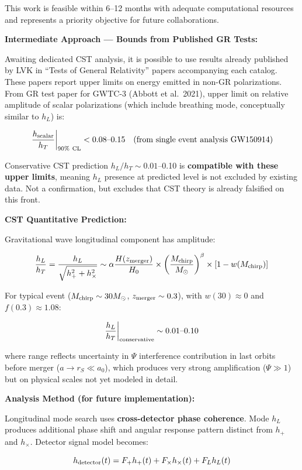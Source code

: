 \documentclass[11pt,a4paper]{article}
\begin{document}
This work is feasible within 6--12 months with adequate computational
resources and represents a priority objective for future collaborations.

\textbf{Intermediate Approach --- Bounds from Published GR Tests:}

Awaiting dedicated CST analysis, it is possible to use results already
published by LVK in ``Tests of General Relativity'' papers accompanying
each catalog. These papers report upper limits on energy emitted in
non-GR polarizations. From GR test paper for GWTC-3 (Abbott et
al.~2021), upper limit on relative amplitude of scalar polarizations
(which include breathing mode, conceptually similar to \(h_L\)) is:

\[\left.\frac{h_{\rm scalar}}{h_T}\right|_{\rm 90\%~CL} < 0.08\text{--}0.15 \quad \text{(from single event analysis GW150914)}\]

Conservative CST prediction \(h_L/h_T \sim 0.01\)--0.10 is
\textbf{compatible with these upper limits}, meaning \(h_L\) presence at
predicted level is not excluded by existing data. Not a confirmation,
but excludes that CST theory is already falsified on this front.

\textbf{CST Quantitative Prediction:}

Gravitational wave longitudinal component has amplitude:

\[\frac{h_L}{h_T} = \frac{h_L}{\sqrt{h_+^2 + h_\times^2}} \sim \alpha \frac{H(z_{\rm merger})}{H_0} \times \left(\frac{M_{\rm chirp}}{M_\odot}\right)^\beta \times [1-w(M_{\rm chirp})]\]

For typical event (\(M_{\rm chirp} \sim 30 M_\odot\),
\(z_{\rm merger} \sim 0.3\)), with \(w(30) \approx 0\) and
\(f(0.3) \approx 1.08\):

\[\frac{h_L}{h_T}\bigg|_{\rm conservative} \sim 0.01\text{--}0.10\]

where range reflects uncertainty in \(\Psi\) interference contribution
in last orbits before merger (\(a \to r_S \ll a_0\)), which produces
very strong amplification (\(\Psi \gg 1\)) but on physical scales not
yet modeled in detail.

\textbf{Analysis Method (for future implementation):}

Longitudinal mode search uses \textbf{cross-detector phase coherence}.
Mode \(h_L\) produces additional phase shift and angular response
pattern distinct from \(h_+\) and \(h_\times\). Detector signal model
becomes:

\[h_{\rm detector}(t) = F_+ h_+(t) + F_\times h_\times(t) + F_L h_L(t)\]
\end{document}
